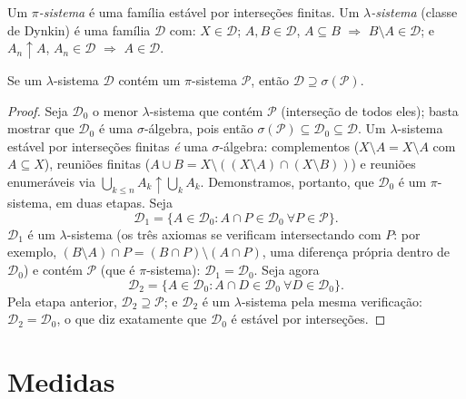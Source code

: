 \begin{definition}\label{def:b3:measure:dynkin}
Um \emph{$\pi$-sistema} é uma
família estável por interseções finitas. Um
\emph{$\lambda$-sistema} (classe de
Dynkin) é uma família $\mathcal D$ com: $X \in \mathcal
D$; $A, B \in \mathcal D$, $A \subseteq B$ $\Rightarrow$ $B
\setminus A \in \mathcal D$; e $A_n \uparrow A$,
$A_n \in
\mathcal D$ $\Rightarrow$ $A \in \mathcal D$.
\end{definition}

\begin{theorem}
\label{thm:b3:measure:dynkin}
Se um $\lambda$-sistema $\mathcal D$ contém um $\pi$-sistema $\mathcal P$, então
$\mathcal D \supseteq
\sigma(\mathcal P)$.
\end{theorem}

\begin{proof}
Seja $\mathcal D_0$ o menor $\lambda$-sistema que contém $\mathcal P$ (interseção de todos
eles); basta mostrar que $\mathcal D_0$ é uma $\sigma$-álgebra, pois então
$\sigma(\mathcal P) \subseteq \mathcal D_0 \subseteq \mathcal
D$. Um $\lambda$-sistema estável por interseções finitas \emph{é} uma
$\sigma$-álgebra: complementos ($X \setminus A = X
\setminus A$ com $A \subseteq X$), reuniões finitas
($A \cup B =
X \setminus ((X\setminus A)\cap(X\setminus B))$) e reuniões enumeráveis via $\bigcup_{k \leq n}A_k \uparrow \bigcup_kA_k$. Demonstramos, portanto, que
$\mathcal D_0$ é um $\pi$-sistema, em duas etapas. Seja
\[
\mathcal D_1 = \{A \in \mathcal D_0 : A \cap P \in \mathcal
D_0 \ \forall P \in \mathcal P\}.
\]
$\mathcal D_1$ é um $\lambda$-sistema (os três axiomas se verificam intersectando com
$P$: por exemplo, $(B\setminus A)\cap P
= (B \cap P)\setminus(A \cap P)$, uma diferença própria dentro de $\mathcal D_0$) e
contém $\mathcal P$ (que é $\pi$-sistema): $\mathcal D_1 = \mathcal D_0$. Seja agora
\[
\mathcal D_2 = \{A \in \mathcal D_0 : A \cap D \in \mathcal
D_0\ \forall D \in \mathcal D_0\}.
\]
Pela etapa anterior, $\mathcal D_2 \supseteq \mathcal P$; e $\mathcal D_2$ é um $\lambda$-sistema pela mesma
verificação: $\mathcal D_2 = \mathcal D_0$, o que diz exatamente que $\mathcal D_0$ é estável por
interseções.
\end{proof}

\section{Medidas}

